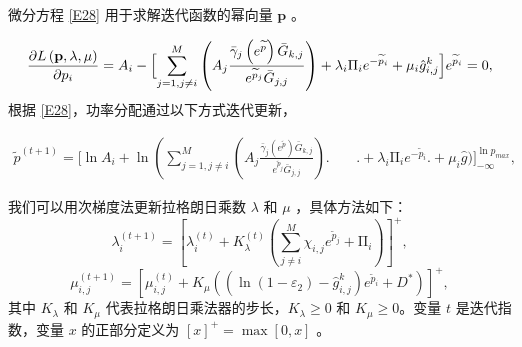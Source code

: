 微分方程 \eqref{E28} 用于求解迭代函数的幂向量 $\mathbf{p}$ 。

\begin{align}\label{E28}
\frac{\partial L\left(\mathbf{p},\lambda,\mu\right)}{\partial p_i}=A_i-\Bigl[\sum_{j=1,j\neq i}^{M}\left(A_j\frac{{\bar{\gamma}}_j\left(e^{\widetilde{p}}\right){\bar{G}}_{k,j}}{e^{{\widetilde{p}}_j}{\bar{G}}_{j,j}}\right)
+\lambda_i\mathrm{\Pi}_ie^{-{\widetilde{p}}_i}+\mu_i{\hat{g}}_{i,j}^k\Bigl]e^{{\widetilde{p}}_i}=0,
\end{align}
根据 \eqref{E28}，功率分配通过以下方式迭代更新，

\begin{align}\label{E29}
{\widetilde{p}}^{\left(t+1\right)}=\Big[\ln{A_i}+\ln\left(\sum_{j=1,j\neq i}^{M}\left(A_j\frac{{\bar{\gamma}}_j\left(e^{\widetilde{p}}\right){\bar{G}}_{k,j}}{e^{{\widetilde{p}}_j}{\bar{G}}_{j,j}}\right)\Big.\right.\phantom{=\;\;}\Big.\!\!\!\!\!\!\!\!\!\!\!+\lambda_i\mathrm{\Pi}_ie^{-{\widetilde{p}}_i}\Big.+\mu_i\hat{g}\Big)
\Big]_{-\infty}^{\ln{p_{max}}},
\end{align}

我们可以用次梯度法更新拉格朗日乘数 $\lambda$ 和 $\mu$ ，具体方法如下：
\begin{equation}\label{E30}
\lambda_i^{\left(t+1\right)}=\left[\lambda_i^{\left(t\right)}+K_\lambda^{\left(t\right)}\left(\sum_{j\neq i}^{M}{\chi_{i,j}e^{{\widetilde{p}}_j}}+\mathrm{\Pi}_i\right)\right]^+,
\end{equation}
\begin{equation}\label{E31}
\mu_{i,j}^{\left(t+1\right)}=\!\left[\mu_{i,j}^{\left(t\right)}+\!K_\mu\!\left(\left(\ln\left(1-\varepsilon_2\right)-{\hat{g}}_{i,j}^k\right)e^{{\widetilde{p}}_i}+D^\ast\right)\right]^+,
\end{equation}
其中 $K_\lambda$ 和 $K_\mu$ 代表拉格朗日乘法器的步长，$K_\lambda\geq0$ 和 $K_\mu\geq0$。变量 $t$ 是迭代指数，变量 $x$ 的正部分定义为 $\left[x\right]^+=\max{\left[0,x\right]} $ 。

